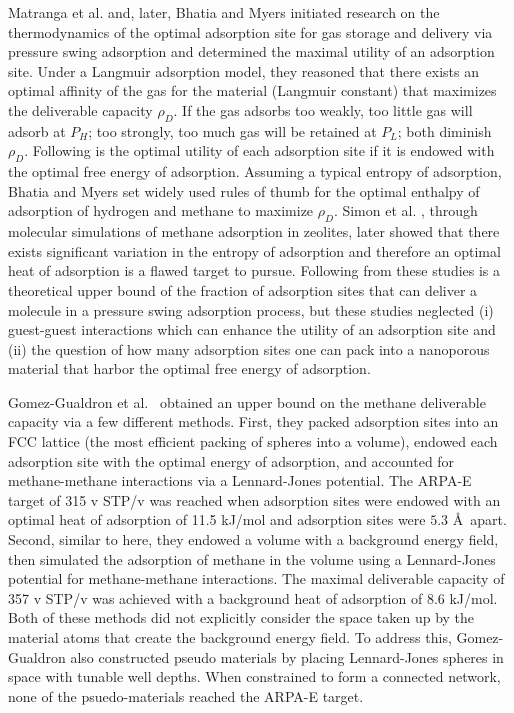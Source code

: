 \documentclass{nature}
\begin{document}
Matranga et al. \cite{matranga1992storage} and, later, Bhatia and Myers \cite{bhatia2006optimum} initiated research on the thermodynamics of the optimal adsorption site for gas storage and delivery via pressure swing adsorption and determined the maximal utility of an adsorption site. Under a Langmuir adsorption model, they reasoned that there exists an optimal affinity of the gas for the material (Langmuir constant) that maximizes the deliverable capacity $\rho_D$. If the gas adsorbs too weakly, too little gas will adsorb at $P_H$; too strongly, too much gas will be retained at $P_L$; both diminish $\rho_D$. Following is the optimal utility of each adsorption site if it is endowed with the optimal free energy of adsorption. Assuming a typical entropy of adsorption, Bhatia and Myers \cite{bhatia2006optimum} set widely used rules of thumb for the optimal enthalpy of adsorption of hydrogen and methane to maximize $\rho_D$. Simon et al. \cite{simon2014optimizing}, through molecular simulations of methane adsorption in zeolites, later showed that there exists significant variation in the entropy of adsorption and therefore an optimal heat of adsorption is a flawed target to pursue. Following from these studies is a theoretical upper bound of the fraction of adsorption sites that can deliver a molecule in a pressure swing adsorption process, but these studies neglected (i) guest-guest interactions which can enhance the utility of an adsorption site \cite{simon2014optimizing} and (ii) the question of how many adsorption sites one can pack into a nanoporous material that harbor the optimal free energy of adsorption.

Gomez-Gualdron et al.\ \cite{gomez2017impact} obtained an upper bound on the methane deliverable capacity via a few different methods. First, they packed adsorption sites into an FCC lattice (the most efficient packing of spheres into a volume), endowed each adsorption site with the optimal energy of adsorption, and accounted for methane-methane interactions via a Lennard-Jones potential. The ARPA-E target of 315 v STP/v was reached when adsorption sites were endowed with an optimal heat of adsorption of 11.5 kJ/mol and adsorption sites were $5.3$ \AA~apart. Second, similar to here, they endowed a volume with a background energy field, then simulated the adsorption of methane in the volume using a Lennard-Jones potential for methane-methane interactions. The maximal deliverable capacity of 357 v STP/v was achieved with a background heat of adsorption of 8.6 kJ/mol. Both of these methods did not explicitly consider the space taken up by the material atoms that create the background energy field. To address this, Gomez-Gualdron also constructed pseudo materials by placing Lennard-Jones spheres in space with tunable well depths. When constrained to form a connected network, none of the psuedo-materials reached the ARPA-E target.
\end{document}

